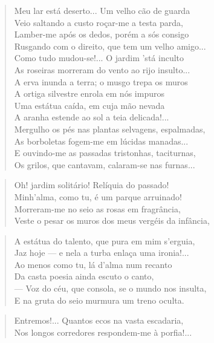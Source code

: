 \begin{anexosenv}
\begin{verse}
Meu lar está deserto... Um velho cão de guarda \\
Veio saltando a custo roçar-me a testa parda, \\
Lamber-me após os dedos, porém a sós consigo \\
Rusgando com o direito, que tem um velho amigo... \\
Como tudo mudou-se!... O jardim 'stá inculto \\
As roseiras morreram do vento ao rijo insulto... \\
A erva inunda a terra; o musgo trepa os muros \\
A ortiga silvestre enrola em nós impuros \\
Uma estátua caída, em cuja mão nevada \\
A aranha estende ao sol a teia delicada!... \\
Mergulho os pés nas plantas selvagens, espalmadas, \\
As borboletas fogem-me em lúcidas manadas... \\
E ouvindo-me as passadas tristonhas, taciturnas, \\
Os grilos, que cantavam, calaram-se nas furnas... \\
\end{verse}

\begin{verse}
Oh! jardim solitário! Relíquia do passado! \\
Minh'alma, como tu, é um parque arruinado! \\
Morreram-me no seio as rosas em fragrância, \\
Veste o pesar os muros dos meus vergéis da infância, \\
\end{verse}

\begin{verse}
A estátua do talento, que pura em mim s'erguia, \\
Jaz hoje — e nela a turba enlaça uma ironia!... \\
Ao menos como tu, lá d'alma num recanto \\
Da casta poesia ainda escuto o canto, \\
— Voz do céu, que consola, se o mundo nos insulta, \\
E na gruta do seio murmura um treno oculta. \\
\end{verse}

\begin{verse}
Entremos!... Quantos ecos na vasta escadaria, \\
Nos longos corredores respondem-me à porfia!... \\
\end{verse}


\end{anexosenv}
